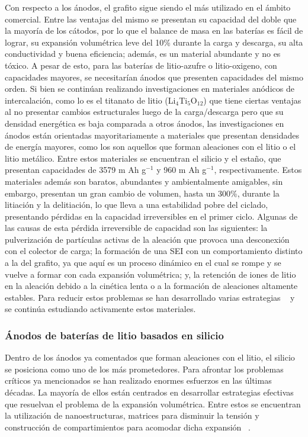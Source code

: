 Con respecto a los ánodos, el grafito sigue siendo el más utilizado en el ámbito
comercial. Entre las ventajas del mismo se presentan su capacidad del doble que 
la mayoría de los cátodos, por lo que el balance de masa en las baterías es fácil
de lograr, su expansión volumétrica leve del 10\% durante la carga y descarga, su
alta conductividad y buena eficiencia; además, es un material abundante y no es
tóxico. A pesar de esto, para las baterías de litio-azufre o litio-oxigeno, con
capacidades mayores, se necesitarían ánodos que presenten capacidades del mismo
orden. Si bien se continúan realizando investigaciones en materiales anódicos de 
intercalación, como lo es el titanato de litio (Li$_4$Ti$_5$O$_{12}$) que tiene
ciertas ventajas al no presentar cambios estructurales luego de la carga/descarga
pero que su densidad energética es baja comparada a otros ánodos, las 
investigaciones en ánodos están orientadas mayoritariamente a materiales que 
presentan densidades de energía mayores, como los son aquellos que forman 
aleaciones con el litio o el litio metálico. Entre estos materiales se encuentran
el silicio y el estaño, que presentan capacidades de 3579 m Ah g$^{-1}$ y
960 m Ah g$^{-1}$, respectivamente. Estos materiales además son baratos, 
abundantes y ambientalmente amigables, sin embargo, presentan un gran cambio de 
volumen, hasta un 300\%, durante la litiación y la delitiación, lo que lleva a
una estabilidad pobre del ciclado, presentando pérdidas en la capacidad 
irreversibles en el primer ciclo. Algunas de las causas de esta pérdida 
irreversible de capacidad son las siguientes: la pulverización de partículas 
activas de la aleación que provoca una desconexión con el colector de carga; la 
formación de una SEI con un comportamiento distinto a la del grafito, ya que aquí
es un proceso dinámico en el cual se rompe y se vuelve a formar con cada 
expansión volumétrica; y, la retención de iones de litio en la aleación debido a 
la cinética lenta o a la formación de aleaciones altamente estables. Para reducir
estos problemas se han desarrollado varias estrategias ~\cite{zhang2011} y se 
continúa estudiando activamente estos materiales.

\subsubsection{Ánodos de baterías de litio basados en silicio}

Dentro de los ánodos ya comentados que forman aleaciones con el litio, el silicio
se posiciona como uno de los más prometedores. Para afrontar los problemas 
críticos ya mencionados se han realizado enormes esfuerzos en las últimas décadas.
La mayoría de ellos están centrados en desarrollar estrategias efectivas que 
resuelvan el problema de la expansión volumétrica. Entre estos se encuentran la 
utilización de nanoestructuras, matrices para disminuir la tensión y construcción
de compartimientos para acomodar dicha expansión ~\cite{zuo2016}.


